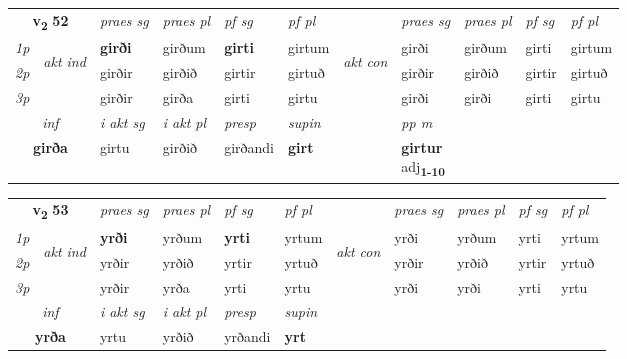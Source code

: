 \noindent
\begin{tabular}{lllllllllll} \toprule
\multicolumn{2}{c}{\textbf{v{\textsubscript{2}}} \Large{\textbf{52}}}  &  \textit{praes sg}  & \textit{praes pl}  &\textit{ pf sg} & \textit{pf pl} &  &  \textit{praes sg}  & \textit{praes pl}  & \textit{pf sg} & \textit{pf pl } \\*
	\cmidrule{3-6} \cmidrule{8-11}
 {\textit{1p}} & \multirow{3}{*}{\begin{turn}{90}\textit{akt ind}\end{turn}} & \textbf{girði} & girðum & \textbf{girti} & girtum & \multirow{3}{*}{\begin{turn}{90}\textit{akt con}\end{turn}} &girði & girðum & girti & girtum\\*
 {\textit{2p}} &  &  girðir  & girðið & girtir & girtuð & & girðir & girðið & girtir & girtuð \\*
{\textit{3p}} &  & girðir & girða & girti & girtu & & girði & girði& girti & girtu \\*
\cmidrule{3-6} \cmidrule{8-11}

   \multicolumn{2}{c}{\textit{inf}}  & \textit{i akt sg} & \textit{i akt pl}   & \textit{presp} & \textit{supin}  && \textit{pp m} \\*
  \multicolumn{2}{c}{\textbf{girða}} & girtu  & girðið   & girðandi &  \textbf{girt}  && \specialcell{\textbf{girtur} \\ adj\textbf{\textsubscript{1-10}}} \\*
\end{tabular}

\noindent
\begin{tabular}{lllllllllll} \toprule
\multicolumn{2}{c}{\textbf{v{\textsubscript{2}}} \Large{\textbf{53}}}  &  \textit{praes sg}  & \textit{praes pl}  &\textit{ pf sg} & \textit{pf pl} &  &  \textit{praes sg}  & \textit{praes pl}  & \textit{pf sg} & \textit{pf pl } \\*
	\cmidrule{3-6} \cmidrule{8-11}
 {\textit{1p}} & \multirow{3}{*}{\begin{turn}{90}\textit{akt ind}\end{turn}} & \textbf{yrði} & yrðum & \textbf{yrti} & yrtum & \multirow{3}{*}{\begin{turn}{90}\textit{akt con}\end{turn}} &yrði & yrðum & yrti & yrtum\\*
 {\textit{2p}} &  &  yrðir  & yrðið & yrtir & yrtuð & & yrðir & yrðið & yrtir & yrtuð \\*
{\textit{3p}} &  & yrðir & yrða & yrti & yrtu & & yrði & yrði& yrti & yrtu \\*
\cmidrule{3-6} \cmidrule{8-11}

   \multicolumn{2}{c}{\textit{inf}}  & \textit{i akt sg} & \textit{i akt pl}   & \textit{presp} & \textit{supin}   \\*
  \multicolumn{2}{c}{\textbf{yrða}} & yrtu  & yrðið   & yrðandi &  \textbf{yrt}   \\*
\end{tabular}

